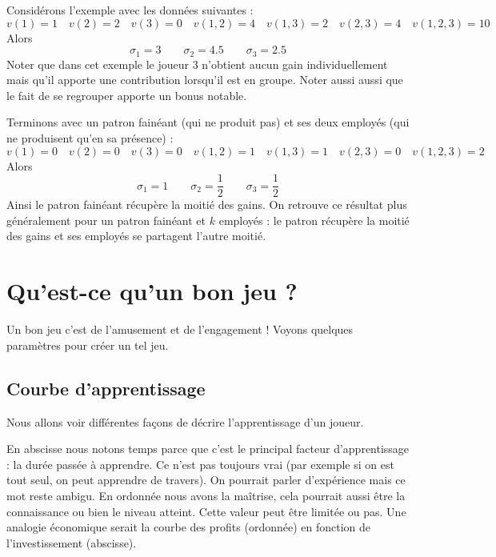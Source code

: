 \documentclass[11pt,class=report,crop=false]{standalone}
\begin{document}
\medskip

Considérons l'exemple avec les données suivantes :
$$v(1) = 1 \quad v(2) = 2 \quad v(3) = 0
\quad v(1,2) = 4 \quad v(1,3) = 2 \quad v(2,3) = 4 \quad v(1,2,3) = 10$$
Alors 
$$\sigma_1 = 3 \qquad \sigma_2 = 4.5 \qquad \sigma_3 = 2.5$$
Noter que dans cet exemple le joueur 3 n'obtient aucun gain individuellement mais qu'il apporte une contribution lorsqu'il est en groupe. Noter aussi aussi que le fait de se regrouper apporte un bonus notable.

\medskip

Terminons avec un patron fainéant (qui ne produit pas) et ses deux employés (qui ne produisent qu'en sa présence) :
$$v(1)=0  \quad v(2) = 0 \quad v(3) = 0
\quad v(1,2) = 1 \quad v(1,3) = 1 \quad v(2,3) = 0 \quad v(1,2,3) = 2$$
Alors 
$$\sigma_1 = 1 \qquad \sigma_2 = \frac12 \qquad \sigma_3 = \frac12$$
Ainsi le patron fainéant récupère la moitié des gains.
On retrouve ce résultat plus généralement pour un patron fainéant et $k$ employés : le patron récupère la moitié des gains et ses employés se partagent l'autre moitié.



\section{Qu'est-ce qu'un \og{}bon\fg{} jeu ?}

Un bon jeu c'est de l'amusement et de l'engagement ! Voyons quelques paramètres pour créer un tel jeu.

\subsection{Courbe d'apprentissage}


Nous allons voir différentes façons de décrire l'apprentissage d'un joueur.


En abscisse nous notons \og{}temps\fg{} parce que c'est le principal facteur d'apprentissage : la durée passée à apprendre. Ce n'est pas toujours vrai (par exemple si on est tout seul, on peut apprendre de travers). On pourrait parler d'\og{}expérience\fg{} mais ce mot reste ambigu.
En ordonnée nous avons la \og{}maîtrise\fg{}, cela pourrait aussi être la \og{}connaissance\fg{} ou bien le \og{}niveau\fg{} atteint. Cette valeur peut être limitée ou pas.
Une analogie économique serait la courbe des \og{}profits\fg{} (ordonnée) en fonction de l'\og{}investissement\fg{} (abscisse).
\end{document}
